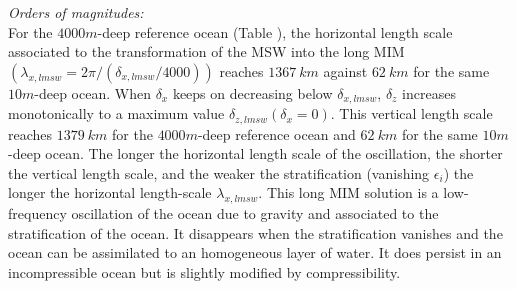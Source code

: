 \textit{Orders of magnitudes:}\\
For the $4000m$-deep reference ocean (Table ), the horizontal length scale associated to the transformation of the MSW into the long MIM $(\lambda_{x,lmsw}=2\pi/(\delta_{x,lmsw}/4000))$ reaches $1367\ km$ against $62\ km$ for the same $10m$-deep ocean. When $\delta_x$ keeps on decreasing below $\delta_{x,lmsw}$, $\delta_z$ increases monotonically to a maximum value $\delta_{z,lmsw}(\delta_x=0)$. This vertical length scale reaches $1379\ km$ for the $4000m$-deep reference ocean and $62\ km$ for the same $10m$-deep ocean. The longer the horizontal length scale of the oscillation, the shorter the vertical length scale, and the weaker the stratification (vanishing $\epsilon_i$) the longer the horizontal length-scale $\lambda_{x,lmsw}$. This long MIM solution is a low-frequency oscillation of the ocean due to gravity and associated to the stratification of the ocean. It disappears when the stratification vanishes and the ocean can be assimilated to an homogeneous layer of water. It does persist in an incompressible ocean but is slightly modified by compressibility.

